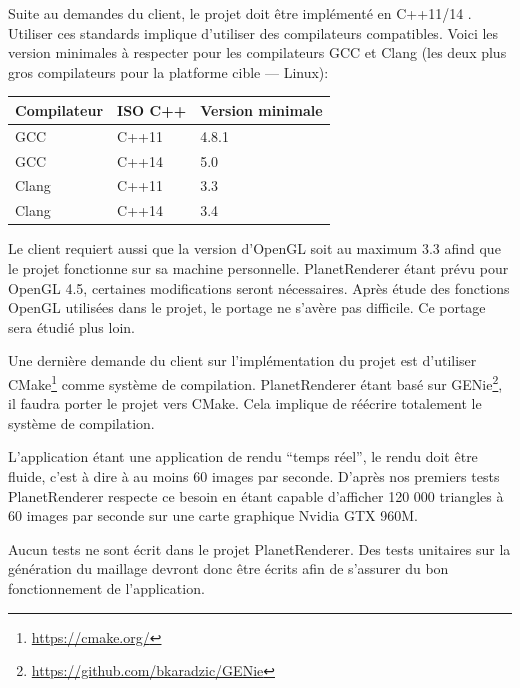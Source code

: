 Suite au demandes du client, le projet doit être implémenté en C++11/14
. Utiliser ces standards implique d'utiliser des compilateurs
compatibles. Voici les version minimales à respecter pour les
compilateurs GCC et Clang (les deux plus gros compilateurs pour la
platforme cible --- Linux):

\begin{longtable}[]{@{}lll@{}}
\toprule
Compilateur & ISO C++ & Version minimale\tabularnewline
\midrule
\endhead
GCC & C++11 & 4.8.1\tabularnewline
GCC & C++14 & 5.0\tabularnewline
Clang & C++11 & 3.3\tabularnewline
Clang & C++14 & 3.4\tabularnewline
\bottomrule
\end{longtable}

Le client requiert aussi que la version d'OpenGL soit au maximum 3.3
afind que le projet fonctionne sur sa machine personnelle.
PlanetRenderer étant prévu pour OpenGL 4.5, certaines modifications
seront nécessaires. Après étude des fonctions OpenGL utilisées dans le
projet, le portage ne s'avère pas difficile. Ce portage sera étudié plus
loin.

Une dernière demande du client sur l'implémentation du projet est
d'utiliser CMake\footnote{\url{https://cmake.org/}} comme système de
compilation. PlanetRenderer étant basé sur GENie\footnote{\url{https://github.com/bkaradzic/GENie}},
il faudra porter le projet vers CMake. Cela implique de réécrire
totalement le système de compilation.

L'application étant une application de rendu ``temps réel'', le rendu
doit être fluide, c'est à dire à au moins 60 images par seconde. D'après
nos premiers tests PlanetRenderer respecte ce besoin en étant capable
d'afficher 120 000 triangles à 60 images par seconde sur une carte
graphique Nvidia GTX 960M.

Aucun tests ne sont écrit dans le projet PlanetRenderer. Des tests
unitaires sur la génération du maillage devront donc être écrits afin de
s'assurer du bon fonctionnement de l'application.
